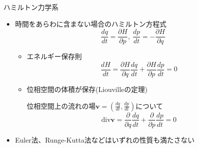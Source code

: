 \begin{frame}[t,fragile]{ハミルトン力学系}
  \begin{itemize}
  \item 時間をあらわに含まない場合のハミルトン方程式
    \[
    \frac{dq}{dt} = \frac{\partial H}{\partial p}, \ \frac{dp}{dt} = -\frac{\partial H}{\partial q}
    \]
    \begin{itemize}
    \item エネルギー保存則
      \[
      \frac{dH}{dt} = \frac{\partial H}{\partial q} \frac{dq}{dt} + \frac{\partial H}{\partial p} \frac{dp}{dt} = 0
      \]
    \item 位相空間の体積が保存(Liouvilleの定理)

      位相空間上の流れの場$\bm{v} = (\frac{dq}{dt},\frac{dp}{dt})$について
      \[
      \text{div} \bm{v} = \frac{\partial}{\partial q} \frac{dq}{dt} + \frac{\partial}{\partial p} \frac{dp}{dt} = 0
      \]
    \end{itemize}
  \item Euler法、Runge-Kutta法などはいずれの性質も満たさない
  \end{itemize}
\end{frame}
